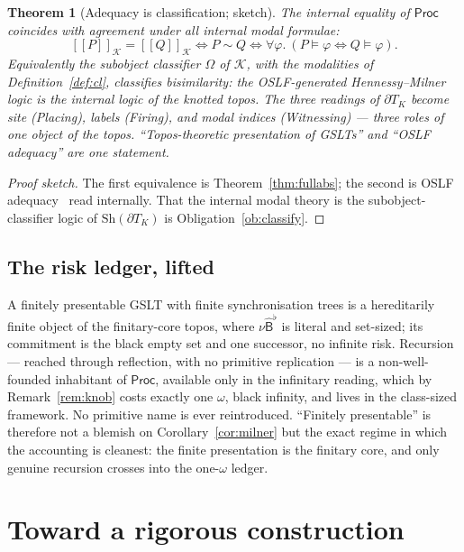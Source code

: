 \documentclass[11pt]{article}
\newcommand{\sem}[1]{[\![#1]\!]}
\newcommand{\Proc}{\mathsf{Proc}}
\newcommand{\dT}{\partial T}
\newcommand{\Sh}{\mathrm{Sh}}
\newcommand{\sB}{\widehat{\mathsf{B}}}
\newcommand{\Ks}{\mathcal{K}}
\newcommand{\Av}{\Omega}
\theoremstyle{plain}
\newtheorem{theorem}{Theorem}
\theoremstyle{definition}
\theoremstyle{remark}
\begin{document}
\begin{theorem}[Adequacy is classification; sketch]\label{thm:keystone}
The internal equality of $\Proc$ coincides with agreement under all internal modal formulae:
\[
\sem{P}_{\Ks}=\sem{Q}_{\Ks}\iff P\sim Q\iff \forall\varphi.\ (P\models\varphi\Leftrightarrow Q\models\varphi).
\]
Equivalently the subobject classifier $\Av$ of $\Ks$, with the modalities of Definition~\ref{def:cl},
\emph{classifies bisimilarity}: the OSLF-generated Hennessy--Milner logic is the internal logic of the
knotted topos. The three readings of $\dT_K$ become site (Placing), labels (Firing), and modal indices
(Witnessing) --- three roles of one object of the topos. ``Topos-theoretic presentation of GSLTs'' and
``OSLF adequacy'' are one statement.
\end{theorem}

\begin{proof}[Proof sketch]
The first equivalence is Theorem~\ref{thm:fullabs}; the second is OSLF
adequacy~\cite[Cor.~19]{knotrho} read internally. That the internal modal theory is the
subobject-classifier logic of $\Sh(\dT_K)$ is Obligation~\ref{ob:classify}.
\end{proof}

\subsection{The risk ledger, lifted}\label{sec:ledger}

A finitely presentable GSLT with finite synchronisation trees is a hereditarily finite object of the
finitary-core topos, where $\nu\sB^\flat$ is literal and set-sized; its commitment is the black empty
set and one successor, no infinite risk. Recursion --- reached through reflection, with no primitive
replication --- is a non-well-founded inhabitant of $\Proc$, available only in the infinitary reading,
which by Remark~\ref{rem:knob} costs exactly one $\omega$, black infinity, and lives in the class-sized
framework. No primitive name is ever reintroduced. ``Finitely presentable'' is therefore not a
blemish on Corollary~\ref{cor:milner} but the exact regime in which the accounting is cleanest: the
finite presentation is the finitary core, and only genuine recursion crosses into the one-$\omega$
ledger.

\section{Toward a rigorous construction}\label{sec:obligations}
\end{document}
